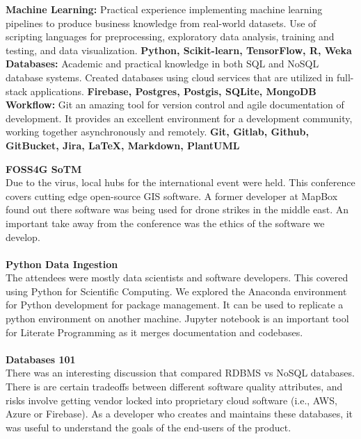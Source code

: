 \documentclass[9pt]{developercv}
\begin{document}
\textbf{Machine Learning:} Practical experience implementing machine learning pipelines to produce business knowledge from real-world datasets. Use of scripting languages for preprocessing, exploratory data analysis, training and testing, and data visualization. \textbf{Python, Scikit-learn, TensorFlow, R, Weka} \\

\textbf{Databases:} Academic and practical knowledge in both SQL and NoSQL database systems. Created databases using cloud services that are utilized in full-stack applications. \textbf{Firebase, Postgres, Postgis, SQLite, MongoDB} \\

\textbf{Workflow:} Git an amazing tool for version control and agile documentation of development. It provides an excellent environment for a development community, working together asynchronously and remotely. \textbf{Git, Gitlab, Github, GitBucket, Jira, LaTeX, Markdown, PlantUML} \\



{
	\textbf{FOSS4G SoTM}
	\\
	Due to the virus, local hubs for the international event were held. This conference covers cutting edge open-source GIS software. A former developer at MapBox found out there software was being used for drone strikes in the middle east. An important take away from the conference was the ethics of the software we develop.
	\\\\
}
{
 	\textbf{Python Data Ingestion}
	\\
	The attendees were mostly data scientists and software developers. This covered using Python for Scientific Computing. We explored the Anaconda environment for Python development for package management. It can be used to replicate a python environment on another machine. Jupyter notebook is an important tool for Literate Programming as it merges documentation and codebases.
	\\\\
}
{
	\textbf{Databases 101}
	\\
	There was an interesting discussion that compared RDBMS vs NoSQL databases. There is are certain tradeoffs between different software quality attributes, and risks involve getting vendor locked into proprietary cloud software (i.e., AWS, Azure or Firebase). As a developer who creates and maintains these databases, it was useful to understand the goals of the end-users of the product.
}
\end{document}
